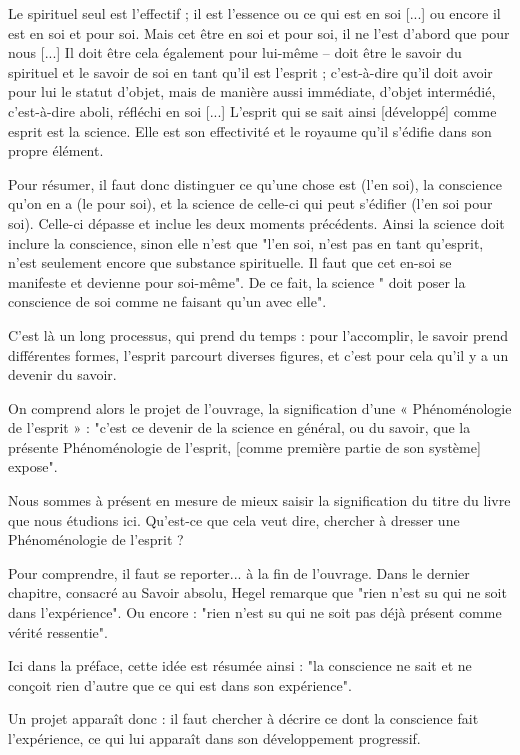    Le spirituel seul est l’effectif ; il est l’essence ou ce qui est en soi [...] ou encore il est en soi et pour soi. Mais cet être en soi et pour soi, il ne l’est d’abord que pour nous [...] Il doit être cela également pour lui-même – doit être le savoir du spirituel et le savoir de soi en tant qu’il est l’esprit ; c’est-à-dire qu’il doit avoir pour lui le statut d’objet, mais de manière aussi immédiate, d’objet intermédié, c’est-à-dire aboli, réfléchi en soi [...] L’esprit qui se sait ainsi [développé] comme esprit est la science. Elle est son effectivité et le royaume qu’il s’édifie dans son propre élément.


Pour résumer, il faut donc distinguer ce qu’une chose est (l’en soi), la conscience qu’on en a (le pour soi), et la science de celle-ci qui peut s’édifier (l’en soi pour soi). Celle-ci dépasse et inclue les deux moments précédents. Ainsi la science doit inclure la conscience, sinon elle n’est que "l’en soi, n’est pas en tant qu’esprit, n’est seulement encore que substance spirituelle. Il faut que cet en-soi se manifeste et devienne pour soi-même". De ce fait, la science " doit poser la conscience de soi comme ne faisant qu’un avec elle".

C’est là un long processus, qui prend du temps : pour l’accomplir, le savoir prend différentes formes, l’esprit parcourt diverses figures, et c’est pour cela qu’il y a un devenir du savoir.

On comprend alors le projet de l’ouvrage, la signification d’une « Phénoménologie de l’esprit » : "c’est ce devenir de la science en général, ou du savoir, que la présente Phénoménologie de l’esprit, [comme première partie de son système] expose".

Nous sommes à présent en mesure de mieux saisir la signification du titre du livre que nous étudions ici. Qu’est-ce que cela veut dire, chercher à dresser une Phénoménologie de l’esprit ?

Pour comprendre, il faut se reporter... à la fin de l’ouvrage. Dans le dernier chapitre, consacré au Savoir absolu, Hegel remarque que "rien n’est su qui ne soit dans l’expérience". Ou encore : "rien n’est su qui ne soit pas déjà présent comme vérité ressentie".

Ici dans la préface, cette idée est résumée ainsi : "la conscience ne sait et ne conçoit rien d’autre que ce qui est dans son expérience".

Un projet apparaît donc : il faut chercher à décrire ce dont la conscience fait l’expérience, ce qui lui apparaît dans son développement progressif.

